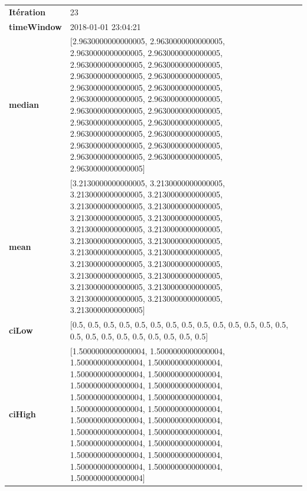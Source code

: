 \begin{table}[H]
	\centering
	\begin{tabularx}{\textwidth}{lX}
		\textbf{Itération}& 23\\
		\textbf{timeWindow} &2018-01-01 23:04:21 \\
		
		\textbf{median}& [2.9630000000000005, 2.9630000000000005, 2.9630000000000005, 2.9630000000000005, 2.9630000000000005, 2.9630000000000005, 2.9630000000000005, 2.9630000000000005, 2.9630000000000005, 2.9630000000000005, 2.9630000000000005, 2.9630000000000005, 2.9630000000000005, 2.9630000000000005, 2.9630000000000005, 2.9630000000000005, 2.9630000000000005, 2.9630000000000005, 2.9630000000000005, 2.9630000000000005, 2.9630000000000005, 2.9630000000000005, 2.9630000000000005] \\
		\textbf{mean} & [3.2130000000000005, 3.2130000000000005, 3.2130000000000005, 3.2130000000000005, 3.2130000000000005, 3.2130000000000005, 3.2130000000000005, 3.2130000000000005, 3.2130000000000005, 3.2130000000000005, 3.2130000000000005, 3.2130000000000005, 3.2130000000000005, 3.2130000000000005, 3.2130000000000005, 3.2130000000000005, 3.2130000000000005, 3.2130000000000005, 3.2130000000000005, 3.2130000000000005, 3.2130000000000005, 3.2130000000000005, 3.2130000000000005] \\
		\textbf{ciLow}& [0.5, 0.5, 0.5, 0.5, 0.5, 0.5, 0.5, 0.5, 0.5, 0.5, 0.5, 0.5, 0.5, 0.5, 0.5, 0.5, 0.5, 0.5, 0.5, 0.5, 0.5, 0.5, 0.5] \\
		\textbf{ciHigh}& [1.5000000000000004, 1.5000000000000004, 1.5000000000000004, 1.5000000000000004, 1.5000000000000004, 1.5000000000000004, 1.5000000000000004, 1.5000000000000004, 1.5000000000000004, 1.5000000000000004, 1.5000000000000004, 1.5000000000000004, 1.5000000000000004, 1.5000000000000004, 1.5000000000000004, 1.5000000000000004, 1.5000000000000004, 1.5000000000000004, 1.5000000000000004, 1.5000000000000004, 1.5000000000000004, 1.5000000000000004, 1.5000000000000004] \\
		
	\end{tabularx} 
\end{table}

